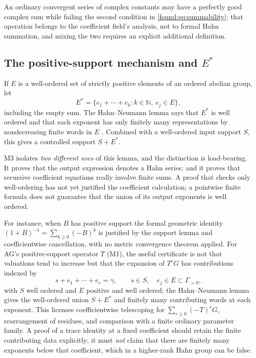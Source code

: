 \documentclass[11pt,letterpaper]{article}
\numberwithin{equation}{section}
\theoremstyle{definition}
\theoremstyle{remark}
\newcommand{\N}{\mathbb N}
\begin{document}
An ordinary convergent series of complex constants may have a perfectly good
complex sum while failing the second condition in \eqref{found:eq:summability};
that operation belongs to the coefficient field's analysis, not to formal Hahn
summation, and mixing the two requires an explicit additional definition.

\subsection{The positive-support mechanism and \texorpdfstring{$E^*$}{E-star}}
\label{found:sub:positivesupport}
If $E$ is a well-ordered set of strictly positive elements of an ordered abelian
group, let
\[
 E^*=\{e_1+\cdots+e_k:k\in\N,\ e_j\in E\},
\]
including the empty sum. The Hahn--Neumann lemma says that $E^*$ is well ordered
and that each exponent has only finitely many representations by nondecreasing
finite words in $E$ \cite{found:Neumann}. Combined with a well-ordered input
support $S$, this gives a controlled support $S+E^*$.

M3 isolates \emph{two different uses} of this lemma, and the distinction is
load-bearing. It proves that the output expression denotes a Hahn series; and it
proves that recursive coefficient equations really involve finite sums. A proof
that checks only well-ordering has not yet justified the coefficient
calculation; a pointwise finite formula does not guarantee that the union of its
output exponents is well ordered.

For instance, when $B$ has positive support the formal geometric identity
$(1+B)^{-1}=\sum_{k\ge0}(-B)^k$ is justified by the support lemma and
coefficientwise cancellation, with no metric convergence theorem applied. For
AG's positive-support operator $T$ (M1), the useful certificate is not that
valuations tend to increase but that the expansion of $T^rG$ has contributions
indexed by
\[
 s+e_1+\cdots+e_r=\gamma,\qquad s\in S,\quad e_j\in E\subset\Gamma_{>0},
\]
with $S$ well ordered and $E$ positive and well ordered; the Hahn--Neumann lemma
gives the well-ordered union $S+E^*$ and finitely many contributing words at
each exponent. This licenses coefficientwise telescoping for
$\sum_{r\ge0}(-T)^rG$, rearrangement of residues, and comparison with a finite
ordinary parameter family. A proof of a trace identity at a fixed coefficient
should retain the finite contributing data explicitly; it must \emph{not} claim
that there are finitely many exponents below that coefficient, which in a
higher-rank Hahn group can be false.
\end{document}
